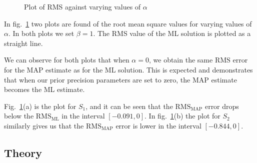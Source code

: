 \documentclass{article}
\begin{document}
\begin{figure}
\caption{Plot of RMS against varying values of $\alpha$}
\label{fig:rmsalpha}
\end{figure}

In fig.~\ref{fig:rmsalpha} two plots are found of the root mean square
values for varying values of $\alpha$. In both plots we set $\beta =
1$. The RMS value of the ML solution is plotted as a straight line.

We can observe for both plots that when $\alpha = 0$, we obtain the
same $\mathrm{RMS}$ error for the MAP estimate as for the ML
solution. This is expected and demonstrates that when our prior
precision parameters are set to zero, the MAP estimate becomes the ML
estimate.

Fig.~\ref{fig:rmsalpha}(a) is the plot for $S_1$, and it can be seen
that the $\mathrm{RMS}_\mathrm{MAP}$ error drops below the
$\mathrm{RMS}_\mathrm{ML}$ in the interval $[-0.091,0]$. In
fig.~\ref{fig:rmsalpha}(b) the plot for $S_2$ similarly gives us that
the $\mathrm{RMS}_\mathrm{MAP}$ error is lower in the interval
$[-0.844,0]$.


\subsection{Theory}
\end{document}
